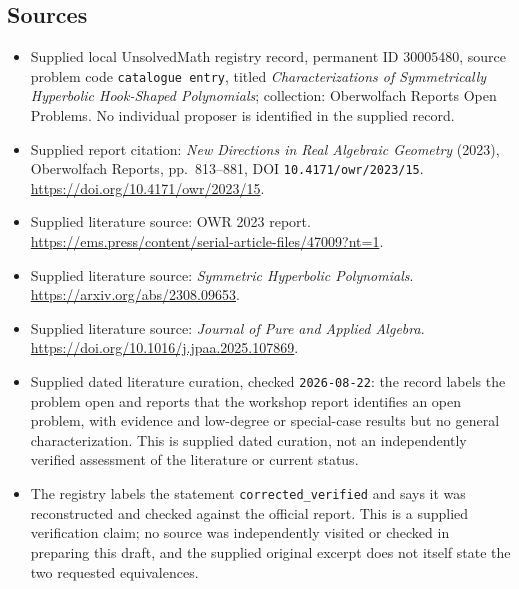 \documentclass[11pt]{article}
\begin{document}
\subsection{Sources}
\begin{itemize}
\item Supplied local UnsolvedMath registry record, permanent ID \(30005480\), source problem code \texttt{catalogue entry}, titled \emph{Characterizations of Symmetrically Hyperbolic Hook-Shaped Polynomials}; collection: Oberwolfach Reports Open Problems. No individual proposer is identified in the supplied record.
\item Supplied report citation: \emph{New Directions in Real Algebraic Geometry} (2023), Oberwolfach Reports, pp.~813--881, DOI \texttt{10.4171/owr/2023/15}. \url{https://doi.org/10.4171/owr/2023/15}.
\item Supplied literature source: OWR 2023 report. \url{https://ems.press/content/serial-article-files/47009?nt=1}.
\item Supplied literature source: \emph{Symmetric Hyperbolic Polynomials}. \url{https://arxiv.org/abs/2308.09653}.
\item Supplied literature source: \emph{Journal of Pure and Applied Algebra}. \url{https://doi.org/10.1016/j.jpaa.2025.107869}.
\item Supplied dated literature curation, checked \texttt{2026-08-22}: the record labels the problem open and reports that the workshop report identifies an open problem, with evidence and low-degree or special-case results but no general characterization. This is supplied dated curation, not an independently verified assessment of the literature or current status.
\item The registry labels the statement \texttt{corrected\_verified} and says it was reconstructed and checked against the official report. This is a supplied verification claim; no source was independently visited or checked in preparing this draft, and the supplied original excerpt does not itself state the two requested equivalences.
\end{itemize}
\end{document}
